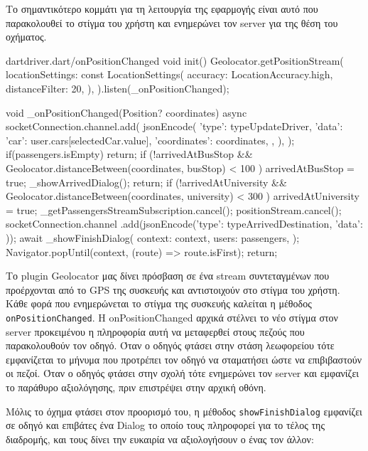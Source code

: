\documentclass[../thesis.tex]{subfiles}
\begin{document}
Το σημαντικότερο κομμάτι για τη λειτουργία της εφαρμογής είναι αυτό που παρακολουθεί το στίγμα του χρήστη και ενημερώνει τον server για της θέση του οχήματος.

\begin{codeblock}{dart}{driver.dart/onPositionChanged}
  void init(){
    Geolocator.getPositionStream(
        locationSettings: const LocationSettings(
          accuracy: LocationAccuracy.high,
          distanceFilter: 20,
        ),
      ).listen(_onPositionChanged);
  }

  void _onPositionChanged(Position? coordinates) async {
    socketConnection.channel.add(
      jsonEncode({
        'type': typeUpdateDriver,
        'data': {
          'car': user.cars[selectedCar.value],
          'coordinates': coordinates,
        },
      }),
    );
    if(passengers.isEmpty) return;
    if (!arrivedAtBusStop &&
        Geolocator.distanceBetween(coordinates, busStop) < 100
        ) {
      arrivedAtBusStop = true;
      _showArrivedDialog();
      return;
    }
    if (!arrivedAtUniversity &&
        Geolocator.distanceBetween(coordinates, university) < 300
        ) {
      arrivedAtUniversity = true;
      _getPassengersStreamSubscription.cancel();
      positionStream.cancel();
      socketConnection.channel
          .add(jsonEncode({'type': typeArrivedDestination, 'data': {}}));
      await _showFinishDialog(
        context: context,
        users: passengers,
      );
      Navigator.popUntil(context, (route) => route.isFirst);
      return;
    }
  }
\end{codeblock}

Το plugin Geolocator μας δίνει πρόσβαση σε ένα stream συντεταγμένων που προέρχονται από το GPS της συσκευής και αντιστοιχούν στο στίγμα του χρήστη.
Κάθε φορά που ενημερώνεται το στίγμα της συσκευής καλείται η μέθοδος \texttt{onPositionChanged}.
Η onPositionChanged αρχικά στέλνει το νέο στίγμα στον server προκειμένου η πληροφορία αυτή να μεταφερθεί στους πεζούς που παρακολουθούν τον οδηγό.
Όταν ο οδηγός φτάσει στην στάση λεωφορείου τότε εμφανίζεται το μήνυμα που προτρέπει τον οδηγό να σταματήσει ώστε να επιβιβαστούν οι πεζοί.
Όταν ο οδηγός φτάσει στην σχολή τότε ενημερώνει τον server και εμφανίζει το παράθυρο αξιολόγησης, πριν επιστρέψει στην αρχική οθόνη.

Μόλις το όχημα φτάσει στον προορισμό του, η μέθοδος \texttt{showFinishDialog} εμφανίζει σε οδηγό και επιβάτες ένα Dialog το οποίο τους πληροφορεί για το τέλος της διαδρομής, και τους δίνει την ευκαιρία να αξιολογήσουν ο ένας τον άλλον:
\end{document}
